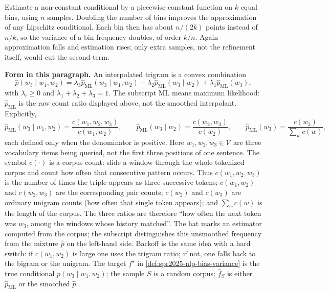 \documentclass[11pt,a4paper]{article}
\theoremstyle{definition}
\begin{document}
\begin{example}
Estimate a non-constant conditional by a piecewise-constant function on \(k\) equal bins, using \(n\) samples. Doubling the number of bins improves the approximation of any Lipschitz conditional. Each bin then has about \(n/(2k)\) points instead of \(n/k\), so the variance of a bin frequency doubles, of order \(k/n\). Again approximation falls and estimation rises; only extra samples, not the refinement itself, would cut the second term.
\end{example}

\begin{note}
\noindent\textbf{Form in this paragraph.}
An interpolated trigram is a convex combination
\[
\widehat p(w_3\mid w_1,w_2)
=\lambda_3\widehat p_{\mathrm{ML}}(w_3\mid w_1,w_2)
+\lambda_2\widehat p_{\mathrm{ML}}(w_3\mid w_2)
+\lambda_1\widehat p_{\mathrm{ML}}(w_3),
\]
with \(\lambda_i\geq 0\) and \(\lambda_1+\lambda_2+\lambda_3=1\). The subscript \(\mathrm{ML}\) means maximum likelihood: \(\widehat p_{\mathrm{ML}}\) is the raw count ratio displayed above, not the smoothed interpolant. Explicitly,
\[
\widehat p_{\mathrm{ML}}(w_3\mid w_1,w_2)
=\frac{c(w_1,w_2,w_3)}{c(w_1,w_2)},
\qquad
\widehat p_{\mathrm{ML}}(w_3\mid w_2)
=\frac{c(w_2,w_3)}{c(w_2)},
\qquad
\widehat p_{\mathrm{ML}}(w_3)
=\frac{c(w_3)}{\sum_{w}c(w)},
\]
each defined only when the denominator is positive. Here \(w_1,w_2,w_3\in\mathcal{V}\) are three vocabulary items being queried, not the first three positions of one sentence. The symbol \(c(\cdot)\) is a corpus count: slide a window through the whole tokenized corpus and count how often that consecutive pattern occurs. Thus \(c(w_1,w_2,w_3)\) is the number of times the triple appears as three successive tokens; \(c(w_1,w_2)\) and \(c(w_2,w_3)\) are the corresponding pair counts; \(c(w_2)\) and \(c(w_3)\) are ordinary unigram counts (how often that single token appears); and \(\sum_{w}c(w)\) is the length of the corpus. The three ratios are therefore ``how often the next token was \(w_3\), among the windows whose history matched''. The hat marks an estimator computed from the corpus; the subscript distinguishes this unsmoothed frequency from the mixture \(\widehat p\) on the left-hand side. Backoff is the same idea with a hard switch: if \(c(w_1,w_2)\) is large one uses the trigram ratio; if not, one falls back to the bigram or the unigram. The target \(f^\star\) in \cref{def:spr2025-nlp-bias-variance} is the true conditional \(p(w_3\mid w_1,w_2)\); the sample \(S\) is a random corpus; \(\widehat f_S\) is either \(\widehat p_{\mathrm{ML}}\) or the smoothed \(\widehat p\).


\end{note}
\end{document}
